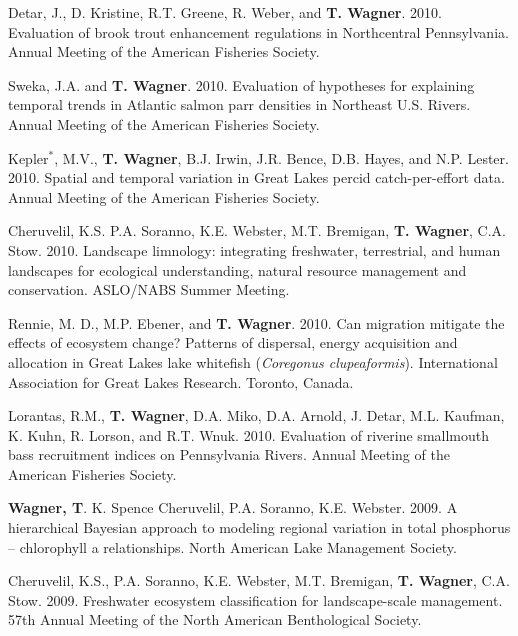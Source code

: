 \documentclass[10pt]{article}
\begin{document}
\begin{flushleft}
\begin{etaremune}
\item Detar, J., D. Kristine, R.T. Greene, R. Weber, and  {\bf T. Wagner}. 2010. Evaluation of brook trout enhancement regulations in Northcentral Pennsylvania. Annual Meeting of the American Fisheries Society. 

\item Sweka, J.A. and  {\bf T. Wagner}. 2010. Evaluation of hypotheses for explaining temporal trends in Atlantic salmon parr densities in Northeast U.S. Rivers. Annual Meeting of the American Fisheries Society.

\item Kepler$^*$, M.V.,  {\bf T. Wagner}, B.J. Irwin, J.R. Bence, D.B. Hayes, and N.P. Lester. 2010. Spatial and temporal variation in Great Lakes percid catch-per-effort data. Annual Meeting of the American Fisheries Society. 

\item Cheruvelil, K.S. P.A. Soranno, K.E. Webster, M.T. Bremigan, {\bf T. Wagner}, C.A. Stow. 2010. Landscape limnology: integrating freshwater, terrestrial, and human landscapes for ecological understanding, natural resource management and conservation. ASLO/NABS Summer Meeting.

\item Rennie, M. D., M.P. Ebener, and {\bf T. Wagner}. 2010. Can migration mitigate the effects of ecosystem change? Patterns of dispersal, energy acquisition and allocation in Great Lakes lake whitefish (\emph{Coregonus clupeaformis}). International Association for Great Lakes Research. Toronto, Canada. 

\item Lorantas, R.M., {\bf T. Wagner}, D.A. Miko, D.A. Arnold, J. Detar, M.L. Kaufman, K. Kuhn, R. Lorson, and R.T. Wnuk. 2010. Evaluation of riverine smallmouth bass recruitment indices on Pennsylvania Rivers. Annual Meeting of the American Fisheries Society. 


\item {\bf Wagner, T}. K. Spence Cheruvelil, P.A. Soranno, K.E. Webster. 2009. A hierarchical Bayesian approach to modeling regional variation in total phosphorus – chlorophyll a relationships. North American Lake Management Society.

\item Cheruvelil, K.S., P.A. Soranno, K.E. Webster, M.T. Bremigan, {\bf T. Wagner}, C.A. Stow. 2009. Freshwater ecosystem classification for landscape-scale management. 57th Annual Meeting of the North American Benthological Society. 


\end{etaremune}
\end{flushleft}
\end{document}
